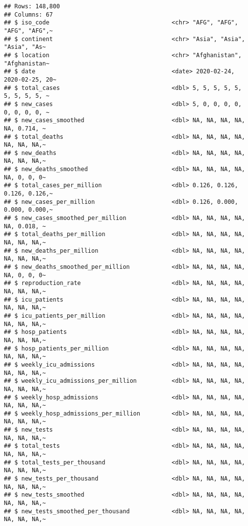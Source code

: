 \documentclass[
]{book}
\begin{document}
\begin{verbatim}
## Rows: 148,800
## Columns: 67
## $ iso_code                                   <chr> "AFG", "AFG", "AFG", "AFG",~
## $ continent                                  <chr> "Asia", "Asia", "Asia", "As~
## $ location                                   <chr> "Afghanistan", "Afghanistan~
## $ date                                       <date> 2020-02-24, 2020-02-25, 20~
## $ total_cases                                <dbl> 5, 5, 5, 5, 5, 5, 5, 5, 5, ~
## $ new_cases                                  <dbl> 5, 0, 0, 0, 0, 0, 0, 0, 0, ~
## $ new_cases_smoothed                         <dbl> NA, NA, NA, NA, NA, 0.714, ~
## $ total_deaths                               <dbl> NA, NA, NA, NA, NA, NA, NA,~
## $ new_deaths                                 <dbl> NA, NA, NA, NA, NA, NA, NA,~
## $ new_deaths_smoothed                        <dbl> NA, NA, NA, NA, NA, 0, 0, 0~
## $ total_cases_per_million                    <dbl> 0.126, 0.126, 0.126, 0.126,~
## $ new_cases_per_million                      <dbl> 0.126, 0.000, 0.000, 0.000,~
## $ new_cases_smoothed_per_million             <dbl> NA, NA, NA, NA, NA, 0.018, ~
## $ total_deaths_per_million                   <dbl> NA, NA, NA, NA, NA, NA, NA,~
## $ new_deaths_per_million                     <dbl> NA, NA, NA, NA, NA, NA, NA,~
## $ new_deaths_smoothed_per_million            <dbl> NA, NA, NA, NA, NA, 0, 0, 0~
## $ reproduction_rate                          <dbl> NA, NA, NA, NA, NA, NA, NA,~
## $ icu_patients                               <dbl> NA, NA, NA, NA, NA, NA, NA,~
## $ icu_patients_per_million                   <dbl> NA, NA, NA, NA, NA, NA, NA,~
## $ hosp_patients                              <dbl> NA, NA, NA, NA, NA, NA, NA,~
## $ hosp_patients_per_million                  <dbl> NA, NA, NA, NA, NA, NA, NA,~
## $ weekly_icu_admissions                      <dbl> NA, NA, NA, NA, NA, NA, NA,~
## $ weekly_icu_admissions_per_million          <dbl> NA, NA, NA, NA, NA, NA, NA,~
## $ weekly_hosp_admissions                     <dbl> NA, NA, NA, NA, NA, NA, NA,~
## $ weekly_hosp_admissions_per_million         <dbl> NA, NA, NA, NA, NA, NA, NA,~
## $ new_tests                                  <dbl> NA, NA, NA, NA, NA, NA, NA,~
## $ total_tests                                <dbl> NA, NA, NA, NA, NA, NA, NA,~
## $ total_tests_per_thousand                   <dbl> NA, NA, NA, NA, NA, NA, NA,~
## $ new_tests_per_thousand                     <dbl> NA, NA, NA, NA, NA, NA, NA,~
## $ new_tests_smoothed                         <dbl> NA, NA, NA, NA, NA, NA, NA,~
## $ new_tests_smoothed_per_thousand            <dbl> NA, NA, NA, NA, NA, NA, NA,~

\end{verbatim}
\end{document}
